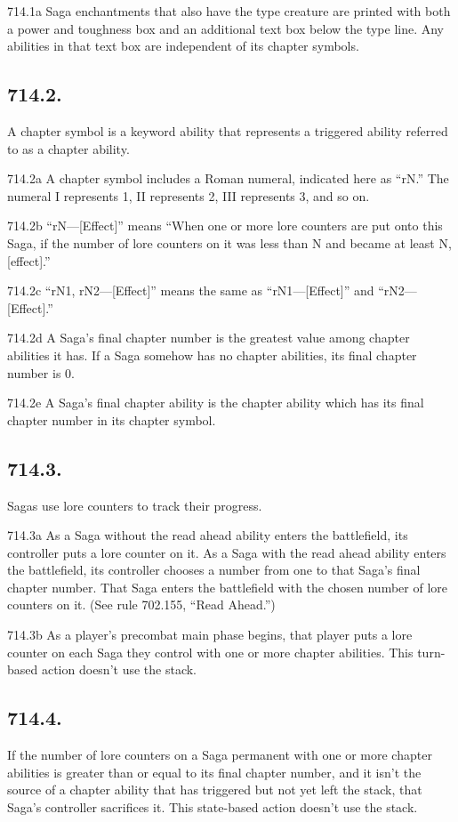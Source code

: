 714.1a Saga enchantments that also have the type creature are printed with both a power and toughness box and an additional text box below the type line. Any abilities in that text box are independent of its chapter symbols.

\subsection*{714.2.}
A chapter symbol is a keyword ability that represents a triggered ability referred to as a chapter ability.

714.2a A chapter symbol includes a Roman numeral, indicated here as “{rN}.” The numeral I represents 1, II represents 2, III represents 3, and so on.

714.2b “{rN}—[Effect]” means “When one or more lore counters are put onto this Saga, if the number of lore counters on it was less than N and became at least N, [effect].”

714.2c “{rN1}, {rN2}—[Effect]” means the same as “{rN1}—[Effect]” and “{rN2}—[Effect].”

714.2d A Saga’s final chapter number is the greatest value among chapter abilities it has. If a Saga somehow has no chapter abilities, its final chapter number is 0.

714.2e A Saga’s final chapter ability is the chapter ability which has its final chapter number in its chapter symbol.

\subsection*{714.3.}
Sagas use lore counters to track their progress.

714.3a As a Saga without the read ahead ability enters the battlefield, its controller puts a lore counter on it. As a Saga with the read ahead ability enters the battlefield, its controller chooses a number from one to that Saga’s final chapter number. That Saga enters the battlefield with the chosen number of lore counters on it. (See rule 702.155, “Read Ahead.”)

714.3b As a player’s precombat main phase begins, that player puts a lore counter on each Saga they control with one or more chapter abilities. This turn-based action doesn’t use the stack.

\subsection*{714.4.}
If the number of lore counters on a Saga permanent with one or more chapter abilities is greater than or equal to its final chapter number, and it isn’t the source of a chapter ability that has triggered but not yet left the stack, that Saga’s controller sacrifices it. This state-based action doesn’t use the stack.


